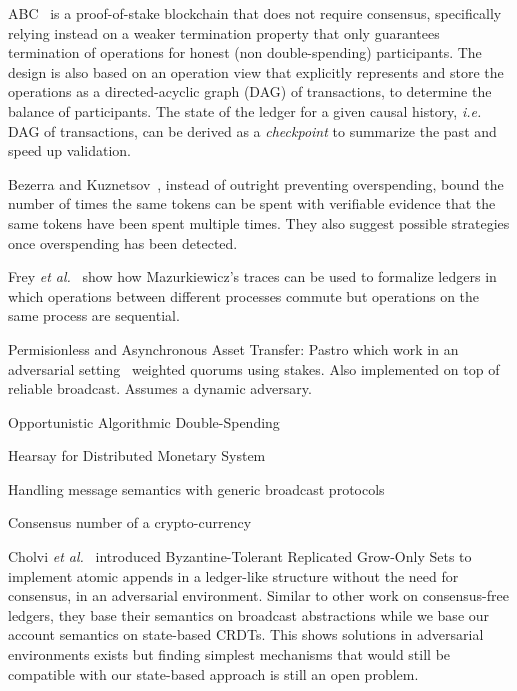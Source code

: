 \documentclass[9pt, oneside]{article}   	%
\begin{document}
ABC~\cite{sliwinski2020abc} is a proof-of-stake blockchain that does not require consensus, specifically relying instead on a weaker termination property that only guarantees termination of operations for honest (non double-spending) participants. The design is also based on an operation view that explicitly represents and store the operations as a directed-acyclic graph (DAG) of transactions, to determine the balance of participants. The state of the ledger for a given causal history, \textit{i.e.} DAG of transactions, can be derived as a \textit{checkpoint} to summarize the past and speed up validation.

Bezerra and Kuznetsov~\cite{bezerra2022tame}, instead of outright preventing overspending, bound the number of times the same tokens can be spent with verifiable evidence that the same tokens have been spent multiple times. They also suggest possible strategies once overspending has been detected.

Frey \textit{et al.}~\cite{frey:hal-03346756} show how Mazurkiewicz’s traces can be used to formalize ledgers in which operations between different processes commute but operations on the same process are sequential.

Permisionless and Asynchronous Asset Transfer: Pastro which work in an adversarial setting~\cite{kuznetsov2021permissionless} weighted quorums using stakes. Also implemented on top of reliable broadcast. Assumes a dynamic adversary.

Opportunistic Algorithmic Double-Spending~\cite{cryptoeprint:2021/1182}

Hearsay for Distributed Monetary System~\cite{georghiades2021needs}

Handling message semantics with generic broadcast protocols~\cite{pedone2002genericbroadcast}

Consensus number of a crypto-currency ~\cite{guerraoui2021consensus}

Cholvi \textit{et al.}~\cite{cholvi2021bdso} introduced Byzantine-Tolerant Replicated Grow-Only Sets to implement atomic appends in a ledger-like structure without the need for consensus, in an adversarial environment. Similar to other work on consensus-free ledgers, they base their semantics on broadcast abstractions while we base our account semantics on state-based CRDTs. This shows solutions in adversarial environments exists but finding simplest mechanisms that would still be compatible with our state-based approach is still an open problem.
\end{document}
